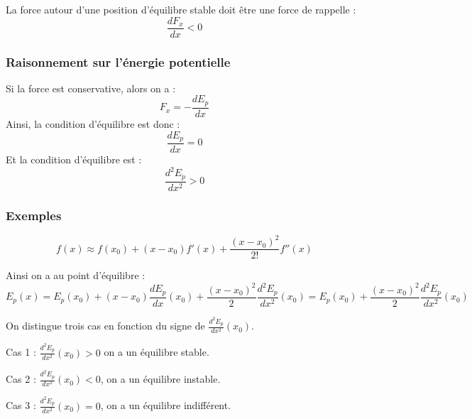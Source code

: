 \begin{remark}[Force]
    La force autour d'une position d'équilibre stable doit être une force de rappelle : 
    \[
        \frac{dF_{x}}{dx} <0
    \]
\end{remark}

\subsubsection{Raisonnement sur l'énergie potentielle}

\begin{theorem}
    Si la force est conservative, alors on a : 
    \[
        F_{x} = - \frac{dE_{p}}{dx}
    \]
    Ainsi, la condition d'équilibre est donc : 
    \[
        \frac{dE_{p}}{dx} = 0
    \]
    Et la condition d'équilibre est : 
    \[
        \frac{d^{2}E_{p}}{dx^{2}} > 0
    \]
\end{theorem}

\subsubsection{Exemples}

\begin{theorem}
    \[
        f(x) \approx f(x_{0}) + (x-x_{\text{0}})f'(x) + \frac{(x-x_{\text{0}})^{2}}{2!}f''(x)
    \]
\end{theorem}


Ainsi on a au point d'équilibre : 
\[
    E_{p}(x) = E_{p}(x_{\text{0}}) + (x-x_{\text{0}}) \frac{dE_{p}}{dx}(x_{\text{0}}) + \frac{(x-x_{\text{0}})^{2}}{2} \frac{d^{2}E_{p}}{dx^{2}}(x_{\text{0}}) = E_{p}(x_{\text{0}}) + \frac{(x-x_{\text{0}})^{2}}{2} \frac{d^{2}E_{p}}{dx^{2}}(x_{\text{0}})
\]

On distingue trois cas en fonction du signe de \(\frac{d^{2}E_{p}}{dx^{2}}(x_{\text{0}})\). \par
Cas 1 : \(\frac{d^{2}E_{p}}{dx^{2}} (x_{\text{0}}) >0\) on a un équilibre stable. \par

Cas 2 : \(\frac{d^{2}E_{p}}{dx^{2}} (x_{\text{0}})<0\), on a un équilibre instable. \par

Cas 3 : \(\frac{d^{2}E_{p}}{dx^{2}} (x_{\text{0}})=0\), on a un équilibre indifférent. \par

